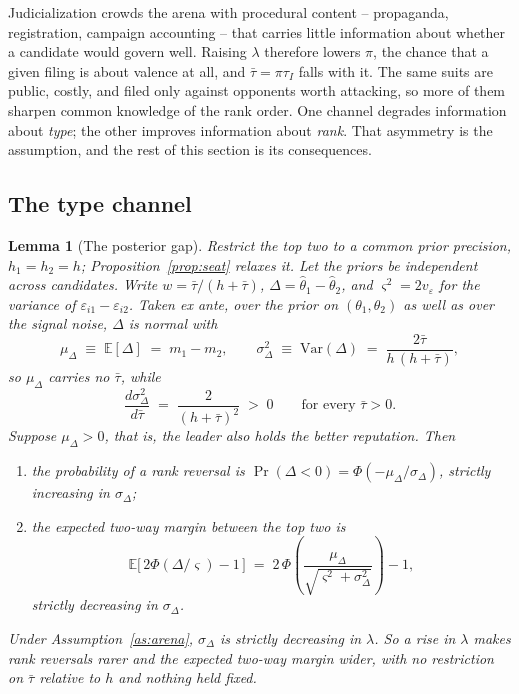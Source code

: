 \documentclass[11pt]{article}
\newtheorem{lemma}{Lemma}
\theoremstyle{definition}
\theoremstyle{remark}
\begin{document}
Judicialization crowds the arena with procedural content -- propaganda,
registration, campaign accounting -- that carries little information about
whether a candidate would govern well. Raising $\lambda$ therefore lowers
$\pi$, the chance that a given filing is about valence at all, and
$\bar\tau = \pi\tau_I$ falls with it. The same suits are public, costly, and
filed only against opponents worth attacking, so more of them sharpen common
knowledge of the rank order. One channel degrades information about
\emph{type}; the other improves information about \emph{rank}. That asymmetry
is the assumption, and the rest of this section is its consequences.

\subsection{The type channel}

\begin{lemma}[The posterior gap]
\label{lem:gap}
Restrict the top two to a common prior precision, $h_1 = h_2 = h$;
Proposition~\ref{prop:seat} relaxes it. Let the priors be independent across
candidates. Write $w = \bar\tau/(h + \bar\tau)$,
$\Delta = \hat\theta_1 - \hat\theta_2$, and $\varsigma^2 = 2v_\varepsilon$ for
the variance of $\varepsilon_{i1} - \varepsilon_{i2}$. Taken ex ante, over the
prior on $(\theta_1,\theta_2)$ as well as over the signal noise, $\Delta$ is
normal with
\[
  \mu_\Delta \;\equiv\; \mathbb{E}[\Delta] \;=\; m_1 - m_2,
  \qquad
  \sigma^2_\Delta \;\equiv\; \mathrm{Var}(\Delta)
  \;=\; \frac{2\bar\tau}{h\,(h + \bar\tau)} ,
\]
so $\mu_\Delta$ carries no $\bar\tau$, while
\[
  \frac{d\sigma^2_\Delta}{d\bar\tau}
  \;=\; \frac{2}{(h + \bar\tau)^2} \;>\; 0
  \qquad\text{for every } \bar\tau > 0 .
\]
Suppose $\mu_\Delta > 0$, that is, the leader also holds the better
reputation. Then
\begin{enumerate}
\item[(a)] the probability of a rank reversal is
      $\Pr(\Delta < 0) = \Phi(-\mu_\Delta/\sigma_\Delta)$, strictly
      \emph{increasing} in $\sigma_\Delta$;
\item[(b)] the expected two-way margin between the top two is
      \[
        \mathbb{E}\bigl[\,2\Phi(\Delta/\varsigma) - 1\,\bigr]
        \;=\; 2\,\Phi\!\left(
          \frac{\mu_\Delta}{\sqrt{\varsigma^2 + \sigma^2_\Delta}}
        \right) - 1,
      \]
      strictly \emph{decreasing} in $\sigma_\Delta$.
\end{enumerate}
Under Assumption~\ref{as:arena}, $\sigma_\Delta$ is strictly decreasing in
$\lambda$. So a rise in $\lambda$ makes rank reversals rarer and the expected
two-way margin wider, with no restriction on $\bar\tau$ relative to $h$ and
nothing held fixed.
\end{lemma}
\end{document}
